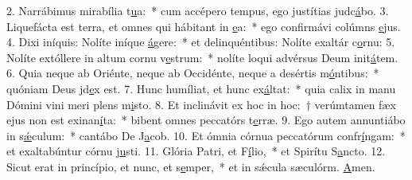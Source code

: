 2. Narrábimus mirabília t\uline{u}a:~* cum accépero tempus, ego justítias judc\uline{á}bo.
3. Liquefácta est terra, et omnes qui hábitant in \uline{e}a:~* ego confirmávi colúmns \uline{e}jus.
4. Dixi iníquis: Nolíte iníque \uline{á}gere:~* et delinquéntibus: Nolíte exaltár c\uline{o}rnu:
5. Nolíte extóllere in altum cornu v\uline{e}strum:~* nolíte loqui advérsus Deum init\uline{á}tem.
6. Quia neque ab Oriénte, neque ab Occidénte, neque a desértis m\uline{ó}ntibus:~* quóniam Deus jd\uline{e}x est.
7. Hunc humíliat, et hunc ex\uline{á}ltat:~* quia calix in manu Dómini vini meri plens m\uline{i}sto.
8. Et inclinávit ex hoc in hoc:~† verúmtamen fæx ejus non est exinan\uline{í}ta:~* bibent omnes peccatórs t\uline{e}rræ.
9. Ego autem annuntiábo in s\uline{ǽ}culum:~* cantábo De J\uline{a}cob.
10. Et ómnia córnua peccatórum confr\uline{í}ngam:~* et exaltabúntur córnu j\uline{u}sti.
11. Glória Patri, et F\uline{í}lio,~* et Spirítu S\uline{a}ncto.
12. Sicut erat in princípio, et nunc, et s\uline{e}mper,~* et in sǽcula sæculórm. \uline{A}men.
